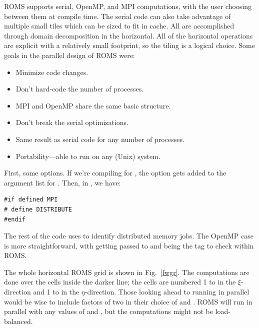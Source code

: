 ROMS supports serial, OpenMP, and MPI computations, with the user
choosing between them at compile time. The serial code can also take
advantage of multiple small
tiles which can be sized to fit in cache. All are accomplished
through domain decomposition in the horizontal. All of the
horizontal operations are explicit with a relatively small
footprint, so the tiling is a logical choice. Some goals in the
parallel design of ROMS were:
\begin{itemize}
  \item Minimize code changes.
  \item Don't hard-code the number of processes.
  \item MPI and OpenMP share the same basic structure.
  \item Don't break the serial optimizations.
  \item Same result as serial code for any number of processes.
  \item Portability---able to run on any (Unix) system.
\end{itemize}
First, some  options. If we're compiling for ,
the option  gets added to the argument list for
. Then, in , we have:
\begin{verbatim}
#if defined MPI
# define DISTRIBUTE
#endif
\end{verbatim}
The rest of the code uses  to identify distributed
memory jobs. The OpenMP case is more straightforward, with
 getting passed to  and 
being the tag to check within ROMS.

The whole horizontal ROMS grid is shown in Fig.\ \ref{fwgr}. The
computations are done over the cells inside the darker line;
the cells are numbered 1 to  in the $\xi$-direction and
1 to  in the $\eta$-direction. Those looking ahead to
running in parallel would be wise to include factors of two in
their choice of  and . ROMS will run in
parallel with any values of  and , but the computations
might not be load-balanced.

